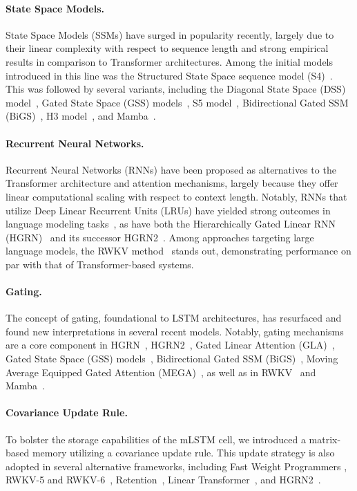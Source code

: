 \paragraph{State Space Models.} State Space Models (SSMs) have surged in popularity recently, largely due to their linear complexity with respect to sequence length and strong empirical results in comparison to Transformer architectures. Among the initial models introduced in this line was the Structured State Space sequence model (S4)~\citep{Gu:21}. This was followed by several variants, including the Diagonal State Space (DSS) model~\citep{Gupta:22}, Gated State Space (GSS) models~\citep{Mehta:22}, S5 model~\citep{Smith:22}, Bidirectional Gated SSM (BiGS)~\citep{Wang:22}, H3 model~\citep{Fu:23}, and Mamba~\citep{Gu:24arxiv}.

\paragraph{Recurrent Neural Networks.} Recurrent Neural Networks (RNNs) have been proposed as alternatives to the Transformer architecture and attention mechanisms, largely because they offer linear computational scaling with respect to context length. Notably, RNNs that utilize Deep Linear Recurrent Units (LRUs) have yielded strong outcomes in language modeling tasks~\citep{Orvieto:23, De:24arxiv}, as have both the Hierarchically Gated Linear RNN (HGRN)~\citep{Qin:23} and its successor HGRN2~\citep{Qin:24arxiv}. Among approaches targeting large language models, the RWKV method~\citep{Peng:23arxivshort,Peng:24arxivshort} stands out, demonstrating performance on par with that of Transformer-based systems.

\paragraph{Gating.}
The concept of gating, foundational to LSTM architectures, has resurfaced and found new interpretations in several recent models. Notably, gating mechanisms are a core component in HGRN~\citep{Qin:23}, HGRN2~\citep{Qin:24arxiv}, Gated Linear Attention (GLA)~\citep{Yang:23arxiv}, Gated State Space (GSS) models~\citep{Mehta:22}, Bidirectional Gated SSM (BiGS)~\citep{Wang:22}, Moving Average Equipped Gated Attention (MEGA)~\citep{Ma:22}, as well as in RWKV~\citep{Peng:23arxivshort} and Mamba~\citep{Gu:24arxiv}.

\paragraph{Covariance Update Rule.} To bolster the storage capabilities of the mLSTM cell, we introduced a matrix-based memory utilizing a covariance update rule. This update strategy is also adopted in several alternative frameworks, including Fast Weight Programmers \citep{Schmidhuber:92ncfastweights,Schlag:21}, RWKV-5 and RWKV-6~\citep{Peng:24arxivshort}, Retention~\citep{Sun:23arxiv}, Linear Transformer~\citep{Katharopoulos:20}, and HGRN2~\citep{Qin:24arxiv}.

